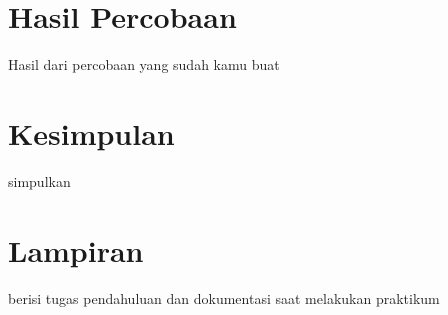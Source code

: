 \section{Hasil Percobaan}
Hasil dari percobaan yang sudah kamu buat

\section{Kesimpulan}
simpulkan

\section{Lampiran}
berisi tugas pendahuluan dan dokumentasi saat melakukan praktikum